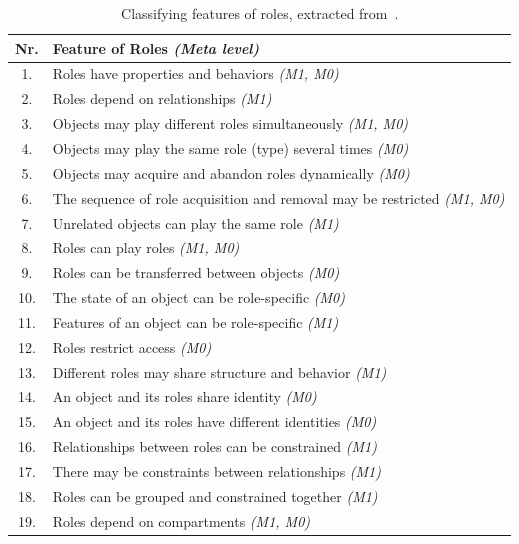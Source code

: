 \begin{table}[tb]
\centering
\caption{Classifying features of roles, extracted
from~\autocite{steimann2000b,kuehn2014}.
\label{tab-features}}
\begin{tabular}[]{@{}cp{}}
\toprule
\textbf{Nr.}
& 
\textbf{Feature of Roles \emph{(Meta level)}}
\tabularnewline
\midrule

1.
 & 
Roles have properties and behaviors \emph{(M1, M0)}
\tabularnewline

2.
 & 
Roles depend on relationships \emph{(M1)}
\tabularnewline

3.
 & 
Objects may play different roles simultaneously \emph{(M1, M0)}
\tabularnewline

4.
 & 
Objects may play the same role (type) several times \emph{(M0)}
\tabularnewline

5.
 & 
Objects may acquire and abandon roles dynamically \emph{(M0)}
\tabularnewline

6.
 & 
The sequence of role acquisition and removal may be restricted
\emph{(M1, M0)}
\tabularnewline

7.
 & 
Unrelated objects can play the same role \emph{(M1)}
\tabularnewline

8.
 & 
Roles can play roles \emph{(M1, M0)}
\tabularnewline

9.
 & 
Roles can be transferred between objects \emph{(M0)}
\tabularnewline

10.
 & 
The state of an object can be role-specific \emph{(M0)}
\tabularnewline

11.
 & 
Features of an object can be role-specific \emph{(M1)}
\tabularnewline

12.
 & 
Roles restrict access \emph{(M0)}
\tabularnewline

13.
 & 
Different roles may share structure and behavior \emph{(M1)}
\tabularnewline

14.
 & 
An object and its roles share identity \emph{(M0)}
\tabularnewline

15.
 & 
An object and its roles have different identities \emph{(M0)}
\tabularnewline

16.
 & 
Relationships between roles can be constrained \emph{(M1)}
\tabularnewline

17.
 & 
There may be constraints between relationships \emph{(M1)}
\tabularnewline

18.
 & 
Roles can be grouped and constrained together \emph{(M1)}
\tabularnewline

19.
 & 
Roles depend on compartments \emph{(M1, M0)}
\tabularnewline


\end{tabular}
\end{table}
